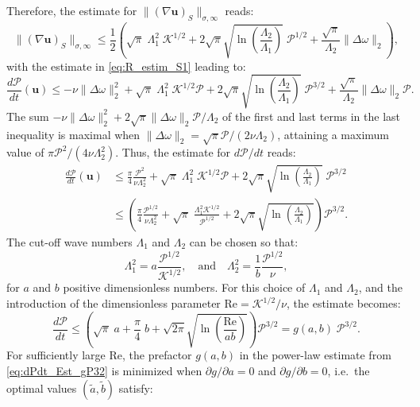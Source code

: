 \documentclass[11pt]{article}
\def\P{{\mathcal{P}}}
\def\K{{\mathcal{K}}}
\newcommand{\uvec}{\mathbf{u}}
\newcommand{\laplacian}{\Delta}
\newcommand{\Reyn}{\textrm{Re}}
\begin{document}
Therefore, the estimate for $\| (\nabla\uvec)_{S} \|_{\sigma,\infty}$ reads:
\begin{equation*}
\| (\nabla\uvec)_{S} \|_{\sigma,\infty} \leq \frac{1}{2}\left(\sqrt{\pi}\;\Lambda^2_1\;\K^{1/2} + 2\sqrt{\pi}\sqrt{\ln\left(\frac{\Lambda_2}{\Lambda_1} \right)}\; \P^{1/2} +  \frac{\sqrt{\pi}}{\Lambda_2} \| \laplacian \omega \|_2\right),
\end{equation*}
with the estimate in \eqref{eq:R_estim_S1} leading to:
\begin{equation*}
\frac{d\P}{dt}(\uvec)  \leq -\nu\| \laplacian \omega \|^2_2 + \sqrt{\pi}\;\Lambda^2_1\;\K^{1/2}\P + 2\sqrt{\pi}\sqrt{\ln\left(\frac{\Lambda_2}{\Lambda_1} \right)}\; \P^{3/2} +  \frac{\sqrt{\pi}}{\Lambda_2} \| \laplacian \omega \|_2\P. 
\end{equation*}
The sum $-\nu\| \laplacian\omega \|_2^2 + 2\sqrt{\pi}\| \laplacian\omega\|_2\P/\Lambda_2$ of the first and last terms in the last inequality is maximal when $\| \laplacian\omega \|_2 = \sqrt{\pi}\P/(2\nu\Lambda_2)$, attaining a maximum value of $\pi\P^2/(4\nu\Lambda^2_2)$. Thus, the estimate for $d\P/dt$ reads:
\begin{equation*}
\begin{aligned}
\frac{d\P}{dt}(\uvec)  & \leq  \frac{\pi}{4}\frac{\P^2}{\nu\Lambda^2_2} + \sqrt{\pi}\;\Lambda^2_1\;\K^{1/2}\P + 2\sqrt{\pi}\sqrt{\ln\left(\frac{\Lambda_2}{\Lambda_1} \right)}\; \P^{3/2} \\
 & \leq \left( \frac{\pi}{4}\frac{\P^{1/2}}{\nu\Lambda^2_2} + 
 \sqrt{\pi}\;\frac{\Lambda^2_1\K^{1/2}}{\P^{1/2}} + 
 2\sqrt{\pi}\sqrt{\ln\left(\frac{\Lambda_2}{\Lambda_1} \right)}\right) \P^{3/2}.
\end{aligned}
\end{equation*}
The cut-off wave numbers  $\Lambda_1$ and $\Lambda_2$ can be chosen so that:
\begin{equation*}
\Lambda_1^2 = a\frac{\P^{1/2}}{\K^{1/2}},\quad\mbox{and}\quad 
\Lambda_2^2 = \frac{1}{b}\frac{\P^{1/2}}{\nu},
\end{equation*}
for $a$ and $b$ positive dimensionless numbers. For this choice of $\Lambda_1$ and $\Lambda_2$, and the introduction of the dimensionless parameter $\Reyn = \K^{1/2}/\nu$, the estimate becomes:
\begin{equation}\label{eq:dPdt_Est_gP32}
\frac{d\P}{dt} \leq \left( \sqrt{\pi} \; a + \frac{\pi}{4} \; b + 
 \sqrt{2\pi}\sqrt{\ln\left(\frac{\mbox{Re}}{ab} \right)} \right)\P^{3/2} = g(a,b)\;\P^{3/2}.
\end{equation}
For sufficiently large $\Reyn$, the prefactor $g(a,b)$ in the power-law estimate from \eqref{eq:dPdt_Est_gP32} is minimized when $\partial g /\partial a = 0$ and $\partial g/\partial b = 0$, i.e.\ the optimal values $(\tilde{a},\tilde{b})$ satisfy:
\end{document}
